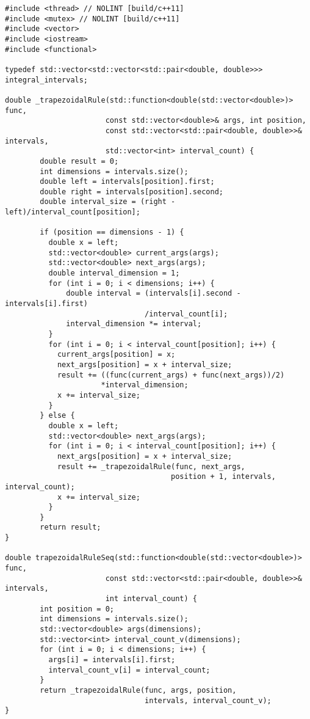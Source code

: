 \documentclass{report}
\begin{document}
\begin{lstlisting}
#include <thread> // NOLINT [build/c++11]
#include <mutex> // NOLINT [build/c++11]
#include <vector>
#include <iostream>
#include <functional>

typedef std::vector<std::vector<std::pair<double, double>>> integral_intervals;

double _trapezoidalRule(std::function<double(std::vector<double>)> func,
                       const std::vector<double>& args, int position,
                       const std::vector<std::pair<double, double>>& intervals,
                       std::vector<int> interval_count) {
        double result = 0;
        int dimensions = intervals.size();
        double left = intervals[position].first;
        double right = intervals[position].second;
        double interval_size = (right - left)/interval_count[position];

        if (position == dimensions - 1) {
          double x = left;
          std::vector<double> current_args(args);
          std::vector<double> next_args(args);
          double interval_dimension = 1;
          for (int i = 0; i < dimensions; i++) {
              double interval = (intervals[i].second - intervals[i].first)
                                /interval_count[i];
              interval_dimension *= interval;
          }
          for (int i = 0; i < interval_count[position]; i++) {
            current_args[position] = x;
            next_args[position] = x + interval_size;
            result += ((func(current_args) + func(next_args))/2)
                      *interval_dimension;
            x += interval_size;
          }
        } else {
          double x = left;
          std::vector<double> next_args(args);
          for (int i = 0; i < interval_count[position]; i++) {
            next_args[position] = x + interval_size;
            result += _trapezoidalRule(func, next_args,
                                      position + 1, intervals, interval_count);
            x += interval_size;
          }
        }
        return result;
}

double trapezoidalRuleSeq(std::function<double(std::vector<double>)> func,
                       const std::vector<std::pair<double, double>>& intervals,
                       int interval_count) {
        int position = 0;
        int dimensions = intervals.size();
        std::vector<double> args(dimensions);
        std::vector<int> interval_count_v(dimensions);
        for (int i = 0; i < dimensions; i++) {
          args[i] = intervals[i].first;
          interval_count_v[i] = interval_count;
        }
        return _trapezoidalRule(func, args, position,
                                intervals, interval_count_v);
}


\end{lstlisting}
\end{document}
